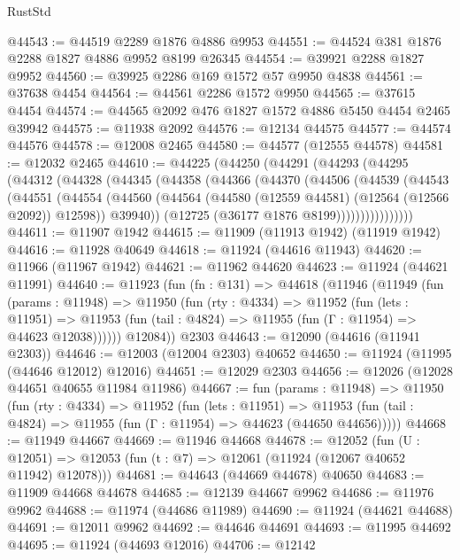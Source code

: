 \begin{lexlean}{RustStd}
\begin{coremodule}
{\begin{coremodule}
{{{{{{{{{{{{{{{{{{{{{{{{{{{{{{{{{{{{{{{{{{{{{{{{{{{{{{{{{{{{{{{{{{{{{{{{{{{{{{{{@44543 := @44519 @2289 @1876 @4886 @9953
@44551 := @44524 @381 @1876 @2288 @1827 @4886 @9952 @8199 @26345
@44554 := @39921 @2288 @1827 @9952
@44560 := @39925 @2286 @169 @1572 @57 @9950 @4838
@44561 := @37638 @4454
@44564 := @44561 @2286 @1572 @9950
@44565 := @37615 @4454
@44574 := @44565 @2092 @476 @1827 @1572 @4886 @5450 @4454 @2465 @39942
@44575 := @11938 @2092
@44576 := @12134 @44575
@44577 := @44574 @44576
@44578 := @12008 @2465
@44580 := @44577 (@12555 @44578)
@44581 := @12032 @2465
@44610 := @44225
    (@44250
      (@44291
        (@44293
          (@44295
            (@44312
              (@44328
                (@44345
                  (@44358
                    (@44366
                      (@44370
                        (@44506
                          (@44539
                            (@44543
                              (@44551
                                (@44554
                                  (@44560
                                    (@44564 (@44580 (@12559 @44581) (@12564 (@12566 @2092)) @12598))
                                    @39940))
                                (@12725 (@36177 @1876 @8199))))))))))))))))
@44611 := @11907 @1942
@44615 := @11909 (@11913 @1942) (@11919 @1942)
@44616 := @11928 @40649
@44618 := @11924 (@44616 @11943)
@44620 := @11966 (@11967 @1942)
@44621 := @11962 @44620
@44623 := @11924 (@44621 @11991)
@44640 := @11923
    (fun (fn : @131) =>
    @44618
      (@11946
        (@11949
          (fun (params : @11948) =>
          @11950
            (fun (rty : @4334) =>
            @11952
              (fun (lets : @11951) =>
              @11953 (fun (tail : @4824) => @11955 (fun (Γ : @11954) => @44623 @12038))))))
        @12084))
    @2303
@44643 := @12090 (@44616 (@11941 @2303))
@44646 := @12003 (@12004 @2303) @40652
@44650 := @11924 (@11995 (@44646 @12012) @12016)
@44651 := @12029 @2303
@44656 := @12026 (@12028 @44651 @40655 @11984 @11986)
@44667 := fun (params : @11948) =>
  @11950
    (fun (rty : @4334) =>
    @11952
      (fun (lets : @11951) =>
      @11953 (fun (tail : @4824) => @11955 (fun (Γ : @11954) => @44623 (@44650 @44656)))))
@44668 := @11949 @44667
@44669 := @11946 @44668
@44678 := @12052
    (fun (U : @12051) => @12053 (fun (t : @7) => @12061 (@11924 (@12067 @40652 @11942) @12078)))
@44681 := @44643 (@44669 @44678) @40650
@44683 := @11909 @44668 @44678
@44685 := @12139 @44667 @9962
@44686 := @11976 @9962
@44688 := @11974 (@44686 @11989)
@44690 := @11924 (@44621 @44688)
@44691 := @12011 @9962
@44692 := @44646 @44691
@44693 := @11995 @44692
@44695 := @11924 (@44693 @12016)
@44706 := @12142
}}}}}}}}}}}}}}}}}}}}}}}}}}}}}}}}}}}}}}}}}}}}}}}}}}}}}}}}}}}}}}}}}}}}}}}}}}}}}}}}
\end{coremodule}}
\end{coremodule}
\end{lexlean}
